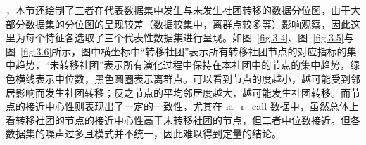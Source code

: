 ，本节还绘制了三者在代表数据集中发生与未发生社团转移的数据分位图，由于大部分数据集的分位图的呈现较差（数据较集中，离群点较多等）影响观察，因此这里为每个特征各选取了三个代表性数据集进行呈现。如图~\ref{fig.3.4}、图~\ref{fig.3.5}与图~\ref{fig.3.6}所示，图中横坐标中“转移社团”表示所有转移社团节点的对应指标的集中趋势，“未转移社团”表示所有演化过程中保持在本社团中的节点的集中趋势，绿色横线表示中位数，黑色圆圈表示离群点。可以看到节点的度越小，越可能受到邻居影响而发生社团转移；反之节点的平均邻居度越大，越可能发生社团转移。而节点的接近中心性则表现出了一定的一致性，尤其在 ia\_r\_call 数据中，虽然总体上看转移社团的节点的接近中心性高于未转移社团的节点，但二者中位数接近。但各数据集的噪声过多且模式并不统一，因此难以得到定量的结论。


